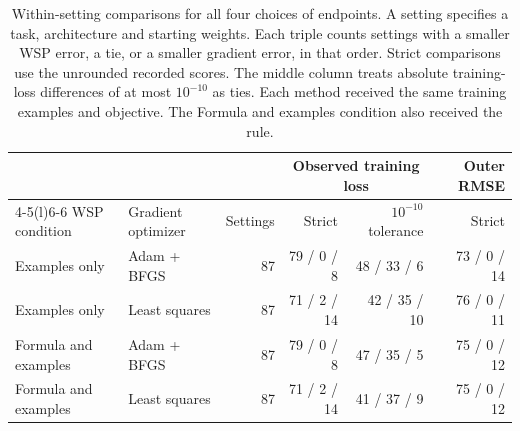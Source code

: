 \begin{table}[t]
\centering
\caption{Within-setting comparisons for all four choices of endpoints. A setting specifies a task, architecture and starting weights. Each triple counts settings with a smaller WSP error, a tie, or a smaller gradient error, in that order. Strict comparisons use the unrounded recorded scores. The middle column treats absolute training-loss differences of at most $10^{-10}$ as ties. Each method received the same training examples and objective. The Formula and examples condition also received the rule.}
\label{tab:paired_methods}
\small
\setlength{\tabcolsep}{3pt}
\begin{tabular}{@{}llr rrr@{}}\toprule
 & & & \multicolumn{2}{c}{Observed training loss} & Outer RMSE\\
\cmidrule(lr){4-5}\cmidrule(l){6-6}
WSP condition & Gradient optimizer & Settings & Strict & $10^{-10}$ tolerance & Strict\\
\midrule
Examples only & Adam + BFGS & 87 & 79 / 0 / 8 & 48 / 33 / 6 & 73 / 0 / 14 \\
Examples only & Least squares & 87 & 71 / 2 / 14 & 42 / 35 / 10 & 76 / 0 / 11 \\
Formula and examples & Adam + BFGS & 87 & 79 / 0 / 8 & 47 / 35 / 5 & 75 / 0 / 12 \\
Formula and examples & Least squares & 87 & 71 / 2 / 14 & 41 / 37 / 9 & 75 / 0 / 12 \\
\bottomrule
\end{tabular}
\end{table}

